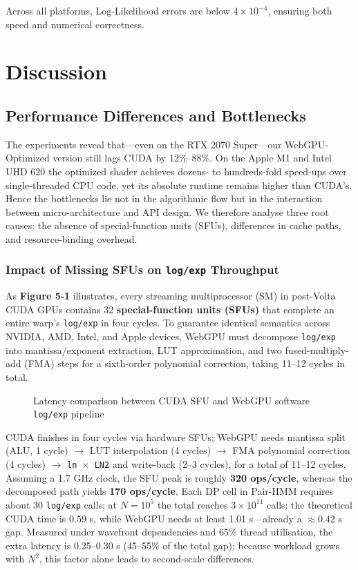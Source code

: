 \documentclass[PhD]{PHlab-thesis}
\begin{document}
Across all platforms, Log-Likelihood errors are below $4 \times 10^{-4}$, ensuring both speed and numerical correctness.

\chapter{Discussion}
\section{Performance Differences and Bottlenecks}
The experiments reveal that—even on the RTX 2070 Super—our WebGPU-Optimized version still lags CUDA by 12\%–88\%.
On the Apple M1 and Intel UHD 620 the optimized shader achieves dozens- to hundreds-fold speed-ups over single-threaded CPU code, yet its absolute runtime remains higher than CUDA’s.
Hence the bottlenecks lie not in the algorithmic flow but in the interaction between micro-architecture and API design.
We therefore analyse three root causes: the absence of special-function units (SFUs), differences in cache paths, and resource-binding overhead.

\subsection{Impact of Missing SFUs on \texttt{log/exp} Throughput}
As \textbf{Figure 5-1} illustrates, every streaming multiprocessor (SM) in post-Volta CUDA GPUs contains 32 \textbf{special-function units (SFUs)} that complete an entire warp’s \texttt{log/exp} in four cycles.
To guarantee identical semantics across NVIDIA, AMD, Intel, and Apple devices, WebGPU must decompose \texttt{log/exp} into mantissa/exponent extraction, LUT approximation, and two fused-multiply-add (FMA) steps for a sixth-order polynomial correction, taking 11–12 cycles in total.

\begin{figure}[h]
    \caption{Latency comparison between CUDA SFU and WebGPU software \texttt{log/exp} pipeline}
    \label{fig:log_exp_pipeline}
\end{figure}

CUDA finishes in four cycles via hardware SFUs; WebGPU needs mantissa split (ALU, 1 cycle) $\rightarrow$ LUT interpolation (4 cycles) $\rightarrow$ FMA polynomial correction (4 cycles) $\rightarrow$ \texttt{ln $\times$ LN2} and write-back (2–3 cycles), for a total of 11–12 cycles.
Assuming a 1.7 GHz clock, the SFU peak is roughly \textbf{320 ops/cycle}, whereas the decomposed path yields \textbf{170 ops/cycle}.
Each DP cell in Pair-HMM requires about 30 \texttt{log/exp} calls; at $N=10^5$ the total reaches $3 \times 10^{11}$ calls: the theoretical CUDA time is 0.59 s, while WebGPU needs at least 1.01 s—already a $\approx$0.42 s gap.
Measured under wavefront dependencies and 65\% thread utilisation, the extra latency is 0.25–0.30 s (45–55\% of the total gap); because workload grows with $N^2$, this factor alone leads to second-scale differences.
\end{document}
